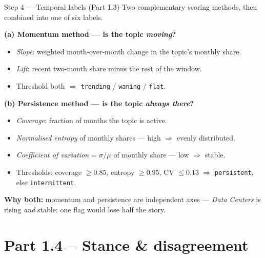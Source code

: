 \documentclass[10pt,aspectratio=169]{beamer}
\begin{document}
\begin{frame}{Step 4 — Temporal labels (Part 1.3)}
Two complementary scoring methods, then combined into one of six labels.

\medskip
\textbf{(a) Momentum method — is the topic \emph{moving}?}
\begin{itemize}
  \item \emph{Slope}: weighted month-over-month change in the topic's monthly share.
  \item \emph{Lift}: recent two-month share minus the rest of the window.
  \item Threshold both $\Rightarrow$ \texttt{trending} / \texttt{waning} / \texttt{flat}.
\end{itemize}

\medskip
\textbf{(b) Persistence method — is the topic \emph{always there}?}
\begin{itemize}
  \item \emph{Coverage}: fraction of months the topic is active.
  \item \emph{Normalised entropy} of monthly shares — high $\Rightarrow$ evenly distributed.
  \item \emph{Coefficient of variation} = $\sigma/\mu$ of monthly share — low $\Rightarrow$ stable.
  \item Thresholds: coverage $\geq 0.85$, entropy $\geq 0.95$, CV $\leq 0.13$ $\Rightarrow$ \texttt{persistent}, else \texttt{intermittent}.
\end{itemize}

\medskip
\textbf{Why both:} momentum and persistence are independent axes — \emph{Data Centers} is rising \emph{and} stable; one flag would lose half the story.
\end{frame}

\section{Part 1.4 -- Stance \& disagreement}
\end{document}
